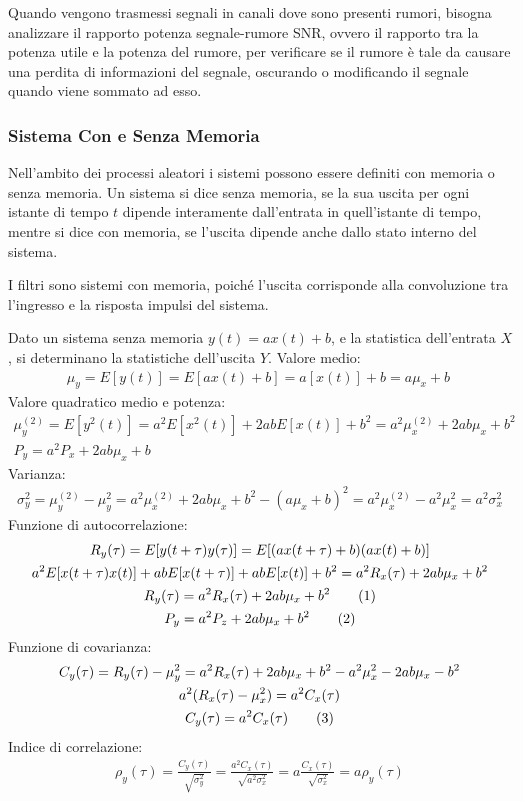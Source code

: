 \documentclass{article}
\newcommand{\tageq}{\tag{\stepcounter{equation}\theequation}}
\numberwithin{equation}{subsection}
\begin{document}
Quando vengono trasmessi segnali in canali dove sono presenti rumori, bisogna analizzare il rapporto potenza segnale-rumore SNR, ovvero il rapporto tra la potenza utile e la 
potenza del rumore, per verificare se il rumore è tale da causare una perdita di informazioni del segnale, oscurando o modificando il segnale quando viene sommato ad esso. 

\subsubsection{Sistema Con e Senza Memoria}

Nell'ambito dei processi aleatori i sistemi possono essere definiti con memoria o senza memoria. Un sistema si dice senza memoria, se la sua uscita per ogni istante di 
tempo $t$ dipende interamente dall'entrata in quell'istante di tempo, mentre si dice con memoria, se l'uscita dipende anche dallo stato interno del sistema. 

I filtri sono sistemi con memoria, poiché l'uscita corrisponde alla convoluzione tra l'ingresso e la risposta impulsi del sistema. 

Dato un sistema senza memoria $y(t)=ax(t)+b$, e la statistica dell'entrata $X$, si determinano la statistiche dell'uscita $Y$. Valore medio:
\begin{gather*}
    \mu_y=E[y(t)]=E[ax(t)+b]=a[x(t)]+b=a\mu_x+b\
\end{gather*}
Valore quadratico medio e potenza:
\begin{gather*}
    \mu_y^{(2)}=E[y^2(t)]=a^2E[x^2(t)]+2abE[x(t)]+b^2=a^2\mu_x^{(2)}+2ab\mu_x+b^2\\
    P_y=a^2P_x+2ab\mu_x+b
\end{gather*}
Varianza:
\begin{gather*}
    \sigma_y^2=\mu_y^{(2)}-\mu_y^2=a^2\mu_x^{(2)}+2ab\mu_x+b^2-(a\mu_x+b)^2=a^2\mu_x^{(2)}-a^2\mu_x^2=a^2\sigma_x^2
\end{gather*}
Funzione di autocorrelazione:
\begin{gather*}
    R_y(\tau)=E[y(t+\tau)y(\tau)]=E[(ax(t+\tau)+b)(ax(t)+b)]\\
    a^2E[x(t+\tau)x(t)]+abE[x(t+\tau)]+abE[x(t)]+b^2=a^2R_x(\tau)+2ab\mu_x+b^2\\
    R_y(\tau)=a^2R_x(\tau)+2ab\mu_x+b^2\tageq\\
    P_y=a^2P_z+2ab\mu_x+b^2\tageq
\end{gather*}
Funzione di covarianza:
\begin{gather*}
    C_y(\tau)=R_y(\tau)-\mu_y^2=a^2R_x(\tau)+2ab\mu_x+b^2-a^2\mu_x^2-2ab\mu_x-b^2\\
    a^2(R_x(\tau)-\mu_x^2)=a^2C_x(\tau)\\
    C_y(\tau)=a^2C_x(\tau)\tageq
\end{gather*}
Indice di correlazione:
\begin{gather}
    \rho_y(\tau)=\displaystyle\frac{C_y(\tau)}{\sqrt{\sigma_y^2}}=\frac{a^2C_x(\tau)}{\sqrt{a^2\sigma_x^2}}=a\frac{C_x(\tau)}{\sqrt{\sigma_x^2}}=a\rho_y(\tau)
\end{gather}
\end{document}
